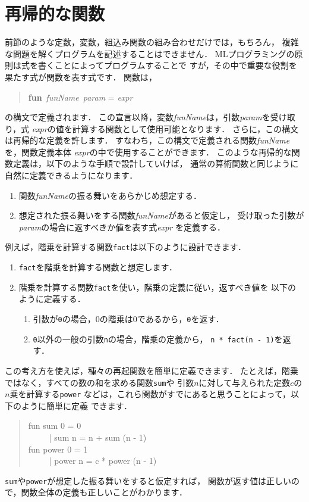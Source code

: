 \documentclass{jbook}
\begin{document}
% 

\section{再帰的な関数}
\label{sec:tutorialRecursion}

	前節のような定数，変数，組込み関数の組み合わせだけでは，もちろん，
複雑な問題を解くプログラムを記述することはできません．
	MLプログラミングの原則は式を書くことによってプログラムすることで
すが，その中で重要な役割を果たす式が関数を表す式です．
	関数は，
\begin{tt}
\begin{quote}
{\bf fun}\ {\it funName}\ {\it param} = {\it expr}
\end{quote}
\end{tt}
の構文で定義されます．
	この宣言以降，変数{\it funName}は，引数{\it param}を受け取り，式
{\it expr}の値を計算する関数として使用可能となります．
	さらに，この構文は再帰的な定義を許します．
	すなわち，この構文で定義される関数{\it funName}を，関数定義本体
{\it expr}の中で使用することができます．
	このような再帰的な関数定義は，以下のような手順で設計していけば，
通常の算術関数と同じように自然に定義できるようになります．
\begin{enumerate}
\item 関数{\it funName}の振る舞いをあらかじめ想定する．
\item 想定された振る舞いをする関数{\it funName}があると仮定し，
受け取った引数が{\it param}の場合に返すべきか値を表す式{\it expr}
を定義する．
\end{enumerate}
	例えば，階乗を計算する関数{\tt fact}は以下のように設計できます．
\begin{enumerate}
\item {\tt fact}を階乗を計算する関数と想定します．
\item 階乗を計算する関数{\tt fact}を使い，階乗の定義に従い，返すべき値を
以下のように定義する．
\begin{enumerate}
\item 引数が{\tt 0}の場合，0の階乗は0であるから，{\tt 0}を返す．
\item {\tt 0}以外の一般の引数{\tt n}の場合，階乗の定義から，
{\tt n * fact(n - 1)}を返す．
\end{enumerate}
\end{enumerate}
	この考え方を使えば，種々の再起関数を簡単に定義できます．
	たとえば，階乗ではなく，すべての数の和を求める関数{\tt sum}や
引数$n$に対して与えられた定数$c$の$n$乗を計算する{\tt power}
などは，これら関数がすでにあると思うことによって，以下のように簡単に定義
できます．
\begin{tt}
\begin{quote}
fun sum 0 = 0\\
\ \ \ \ \ | sum n = n + sum (n - 1)\\
fun power 0 = 1\\
\ \ \ \ \ | power n = c * power (n - 1)
\end{quote}
\end{tt}
	{\tt sum}や{\tt power}が想定した振る舞いをすると仮定すれば，
関数が返す値は正しいので，関数全体の定義も正しいことがわかります．
\end{document}
